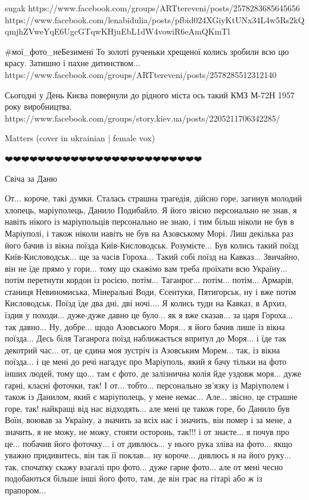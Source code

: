 sugak
https://www.facebook.com/groups/ARTtereveni/posts/2578283685645656
https://www.facebook.com/lenabidulia/posts/pfbid024XGiyKtUNx34L4w5Rs2kQqmjhZVweYqE6UgcGTqwKHjuEbL1dW4vowiR6eAmQKmTl

#мої_фото_неБезимені То золоті рученьки хрещеної колись зробили всю цю красу. Затишно і пахне дитинством...
https://www.facebook.com/groups/ARTtereveni/posts/2578285512312140

Сьогодні у День Києва повернули до рідного міста ось такий КМЗ М-72Н 1957 року виробництва.
https://www.facebook.com/groups/story.kiev.ua/posts/2205211706342285/

Matters (cover in ukrainian | female vox)

❤️❤️❤️❤️❤️❤️❤️❤️❤️❤️❤️❤️❤️❤️❤️❤️❤️❤️❤️❤️❤️❤️❤️❤️

Свіча за Даню

От... короче, такі думки. Сталась страшна трагедія, дійсно горе, загинув
молодий хлопець, маріуполець, Данило Подибайло. Я його звісно персонально не
знав, я навіть нікого із маріупольців персонально не знаю, і тим більш ніколи
не був в Маріуполі, і також ніколи навіть не був на Азовському Морі. Лиш
декілька раз його бачив із вікна поїзда Київ-Кисловодськ. Розумієте...  Був
колись такий поїзд Київ-Кисловодськ... ще за часів Гороха... Такий собі поїзд
на Кавказ... Звичайно, він не їде прямо у гори... тому що скажімо вам треба
проїхати всю Україну... потім перетнути кордон із росією, потім... Таганрог...
потім... потім... Армарів, станиця Невиномиська, Мінеральні Води, Єсентуки,
Пятигорськ, ну і вже потім Кисловодськ. Поїзд їде два дні, дві ночі.... Я
колись туди на Кавказ, в Архиз, їздив у походи... дуже-дуже давно це було... як
я вже сказав... за царя Гороха... так давно... Ну, добре... щодо Азовського
Моря... я його бачив лише із вікна поїзда... Десь біля Таганрога поїзд
наближається впритул до Моря... і їде так декотрий час... от, це єдина моя
зустріч із Азовським Морем... так, із вікна поїзда... і це мені до речі нагадує
про Маріуполь, який я бачу тільки на фото інших людей, тому що... там є фото,
де залізнична колія йде уздовж моря... дуже гарні, класні фоточки, так! І от...
тобто... персонально зв'язку із Маріуполем і також із Данилом, який є
маріуполець, у мене немає... Але...  звісно, це страшне горе, так! найкращі від
нас відходять...  але мені це також горе, бо Данило був Воїн, воював за
Україну, а значить за всіх нас і значить, він помер і за мене, а значить, я не
можу, не можу, стояти осторонь, так!!!  і от знаєте... я почув про це...
побачив його фоточку... і от дивлюсь... у нього рука зліва на фото... якщо
уважно придивитесь, він так її поклав... ну короче... дивлюсь я на його руку...
так, спочатку скажу взагалі про фото... дуже гарне фото... але от мені чесно
подобаються більше інші його фото, там, де він грає на гітарі або ж із
прапором... 

